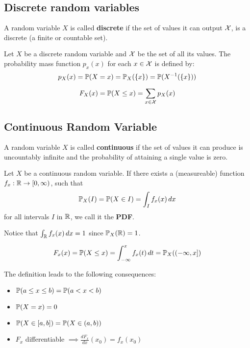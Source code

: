 \pagebreak
\subsection{Discrete random variables}
A random variable \(X\) is called \textbf{discrete} if the set of values it can output \(\DX\), is a discrete (a finite or countable set).

\begin{ddefinition*}
  Let \(X\) be a discrete random variable and \(\DX\) be the set of all its values. The probability mass function \(p_x(x)\) for each \(x \in \DX\) is defined by:
  \[p_X(x) = \P(X = x) = \P_X(\{x\}) = \P(X^{-1}(\{x\}))\]
\end{ddefinition*}

\begin{ddefinition*} \vspace{-5pt}
  \[F_X(x) = \P(X \leq x) = \sum_{x \in \DX} p_X(x)\]
\end{ddefinition*}

\subsection{Continuous Random Variable}
A random variable \(X\) is called \textbf{continuous} if the set of values it can produce is uncountably infinite and the probability of attaining a single value is zero.

\begin{cdefinition*}
  Let \(X\) be a continuous random variable. If there exists a (measureable) function \(f_x: \R \to [0, \infty)\), such that
  \[\P_X(I) = \P(X \in I) = \int_I f_x(x) \,dx\]
  for all intervals \(I\) in \(\R\), we call it the \textbf{PDF}.
\end{cdefinition*}

Notice that \(\int_\R f_x(x) \, dx = 1\) since \(\P_X(\R) = 1\).

\begin{cdefinition*} \vspace{-5pt}
  \[F_x(x) = \P(X \leq x) = \int_{-\infty}^x f_x(t) \,dt = \P_X((-\infty, x])\]
\end{cdefinition*}
The definition leads to the following consequences:
\begin{itemize}
  \item \(\P(a \leq x \leq b) = \P(a < x < b)\)
  \item \(\P(X = x) = 0\)
  \item \(\P(X \in [a, b]) = \P(X \in (a, b))\)
  \item \(F_x\) differentiable \(\implies \frac{dF_x}{dx}(x_0) = f_x(x_0)\)
\end{itemize}
